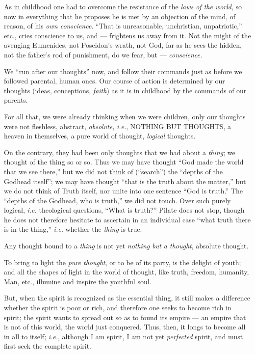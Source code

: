 As in childhood one had to overcome the resistance of the \textit{laws of the 
world}, so now in everything that he proposes he is met by an objection of the 
mind, of reason, of his \textit{own conscience}. ``That is unreasonable, 
unchristian, unpatriotic,'' etc., cries conscience to us, and --- frightens us 
away from it. Not the might of the avenging Eumenides, not Poseidon's wrath, 
not God, far as he sees the hidden, not the father's rod of punishment, do we 
fear, but --- \textit{conscience.}

We ``run after our thoughts'' now, and follow their commands just as before 
we followed parental, human ones. Our course of action is determined by our 
thoughts (ideas, conceptions, \textit{faith}) as it is in childhood by the 
commands of our parents.

For all that, we were already thinking when we were children, only our 
thoughts were not fleshless, abstract, \textit{absolute}, \textit{i.e.}, 
NOTHING BUT THOUGHTS, a heaven in themselves, a pure world of thought, 
\textit{logical} thoughts.

On the contrary, they had been only thoughts that we had about a 
\textit{thing}; we thought of the thing so or so. Thus we may have thought 
``God made the world that we see there,'' but we did not think of 
(``search'') the ``depths of the Godhead itself''; we may have thought 
``that is the truth about the matter,'' but we do not think of Truth itself, 
nor unite into one sentence ``God is truth.'' The ``depths of the Godhead, 
who is truth,'' we did not touch. Over such purely logical, \textit{i.e.} 
theological questions, ``What is truth?'' Pilate does not stop, though he 
does not therefore hesitate to ascertain in an individual case ``what truth 
there is in the thing,'' \textit{i.e.} whether the \textit{thing} is true.

Any thought bound to a \textit{thing} is not yet \textit{nothing but a 
thought}, absolute thought.

To bring to light the \textit{pure thought}, or to be of its party, is the 
delight of youth; and all the shapes of light in the world of thought, like 
truth, freedom, humanity, Man, etc., illumine and inspire the youthful soul.

But, when the spirit is recognized as the essential thing, it still makes a 
difference whether the spirit is poor or rich, and therefore one seeks to 
become rich in spirit; the spirit wants to spread out so as to found its 
empire --- an empire that is not of this world, the world just conquered. Thus, 
then, it longs to become all in all to itself; \textit{i.e.}, although I am 
spirit, I am not yet \textit{perfected} spirit, and must first seek the 
complete spirit.

